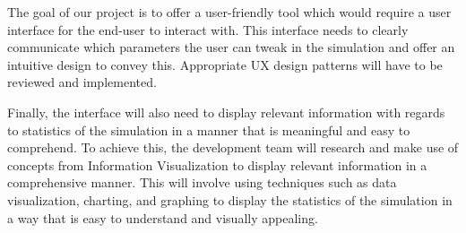 The goal of our project is to offer a user-friendly tool which would require a user interface for the end-user to interact with. This interface needs to clearly communicate which parameters the user can tweak in the simulation and offer an intuitive design to convey this. Appropriate UX design patterns will have to be reviewed and implemented.

Finally, the interface will also need to display relevant information with regards to statistics of the simulation in a manner that is meaningful and easy to comprehend. To achieve this, the development team will research and make use of concepts from Information Visualization to display relevant information in a comprehensive manner. This will involve using techniques such as data visualization, charting, and graphing to display the statistics of the simulation in a way that is easy to understand and visually appealing.